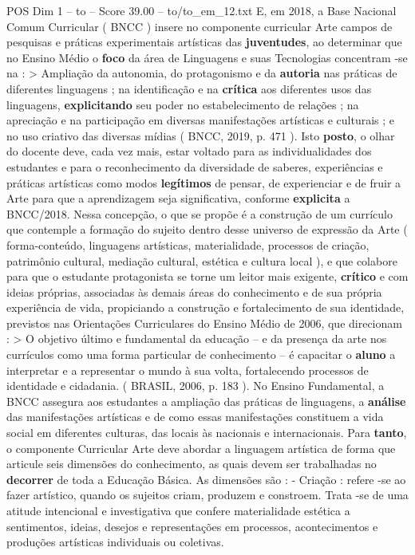 \begin{textsample}{POS Dim 1 – to – Score 39.00 – to/to\_em\_12.txt}
E, em 2018, a Base Nacional Comum Curricular ( BNCC ) insere no componente curricular Arte campos de pesquisas e práticas experimentais artísticas das \textbf{juventudes}, ao determinar que no Ensino Médio o \textbf{foco} da área de Linguagens e suas Tecnologias concentram -se na : > Ampliação da autonomia, do protagonismo e da \textbf{autoria} nas práticas de diferentes linguagens ; na identificação e na \textbf{crítica} aos diferentes usos das linguagens, \textbf{explicitando} seu poder no estabelecimento de relações ; na apreciação e na participação em diversas manifestações artísticas e culturais ; e no uso criativo das diversas mídias ( BNCC, 2019, p. 471 ).
Isto \textbf{posto}, o olhar do docente deve, cada vez mais, estar voltado para as individualidades dos estudantes e para o reconhecimento da diversidade de saberes, experiências e práticas artísticas como modos \textbf{legítimos} de pensar, de experienciar e de fruir a Arte para que a aprendizagem seja significativa, conforme \textbf{explicita} a BNCC/2018.
Nessa concepção, o que se propõe é a construção de um currículo que contemple a formação do sujeito dentro desse universo de expressão da Arte ( forma-conteúdo, linguagens artísticas, materialidade, processos de criação, patrimônio cultural, mediação cultural, estética e cultura local ), e que colabore para que o estudante protagonista se torne um leitor mais exigente, \textbf{crítico} e com ideias próprias, associadas às demais áreas do conhecimento e de sua própria experiência de vida, propiciando a construção e fortalecimento de sua identidade, previstos nas Orientações Curriculares do Ensino Médio de 2006, que direcionam : > O objetivo último e fundamental da educação – e da presença da arte nos currículos como uma forma particular de conhecimento – é capacitar o \textbf{aluno} a interpretar e a representar o mundo à sua volta, fortalecendo processos de identidade e cidadania. ( BRASIL, 2006, p. 183 ).
No Ensino Fundamental, a BNCC assegura aos estudantes a ampliação das práticas de linguagens, a \textbf{análise} das manifestações artísticas e de como essas manifestações constituem a vida social em diferentes culturas, das locais às nacionais e internacionais.
Para \textbf{tanto}, o componente Curricular Arte deve abordar a linguagem artística de forma que articule seis dimensões do conhecimento, as quais devem ser trabalhadas no \textbf{decorrer} de toda a Educação Básica.
As dimensões são : - Criação : refere -se ao fazer artístico, quando os sujeitos criam, produzem e constroem.
Trata -se de uma atitude intencional e investigativa que confere materialidade estética a sentimentos, ideias, desejos e representações em processos, acontecimentos e produções artísticas individuais ou coletivas.

\end{textsample}
